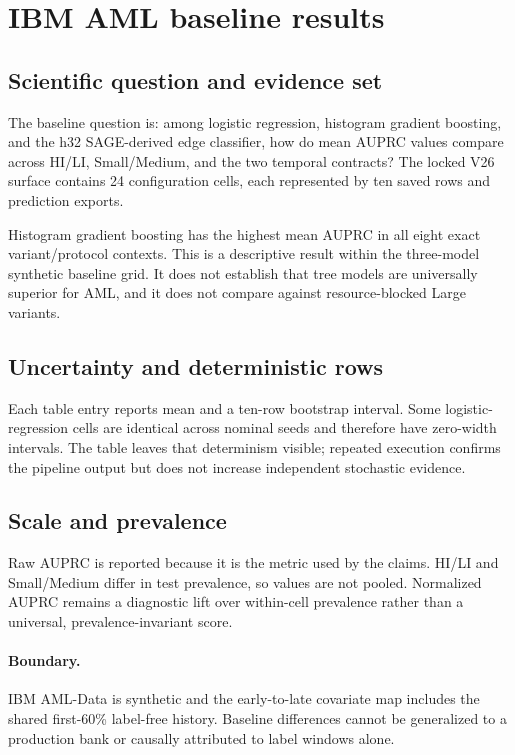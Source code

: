 \section{IBM AML baseline results}
\label{sec:s-ibm-baselines-v2}

\subsection{Scientific question and evidence set}

The baseline question is: among logistic regression, histogram gradient boosting, and the h32 SAGE-derived edge classifier, how do mean AUPRC values compare across HI/LI, Small/Medium, and the two temporal contracts? The locked V26 surface contains 24 configuration cells, each represented by ten saved rows and prediction exports.



Histogram gradient boosting has the highest mean AUPRC in all eight exact variant/protocol contexts. This is a descriptive result within the three-model synthetic baseline grid. It does not establish that tree models are universally superior for AML, and it does not compare against resource-blocked Large variants.

\subsection{Uncertainty and deterministic rows}

Each table entry reports mean and a ten-row bootstrap interval. Some logistic-regression cells are identical across nominal seeds and therefore have zero-width intervals. The table leaves that determinism visible; repeated execution confirms the pipeline output but does not increase independent stochastic evidence.

\subsection{Scale and prevalence}

Raw AUPRC is reported because it is the metric used by the claims. HI/LI and Small/Medium differ in test prevalence, so values are not pooled. Normalized AUPRC remains a diagnostic lift over within-cell prevalence rather than a universal, prevalence-invariant score.

\paragraph{Boundary.}
IBM AML-Data is synthetic and the early-to-late covariate map includes the shared first-60\% label-free history. Baseline differences cannot be generalized to a production bank or causally attributed to label windows alone.
